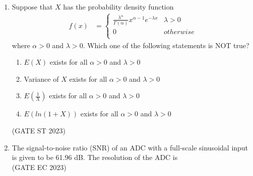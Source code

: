 \begin{enumerate}[label=\thechapter.\arabic*,ref=\thechapter.\theenumi]
\item Suppose that $X$ has the probability density function
\begin{align}
f(x)&=
\begin{cases}
\frac{\lambda^{\alpha}}{\Gamma(\alpha)}x^{\alpha - 1} e^{-\lambda x} & \lambda > 0\\
0 & otherwise\\
\end{cases}
\end{align}
where $\alpha > 0$ and $\lambda > 0$. Which one of the following statements is NOT true?
\begin{enumerate}
\item $E(X)$ exists for all $\alpha > 0 $ and $ \lambda > 0$
\item Variance of $X$ exists for all $\alpha > 0$ and $\lambda > 0$
\item $E(\frac{1}{X})$ exists for all $\alpha > 0$ and $\lambda > 0$
\item $E(ln(1+X))$ exists for all $\alpha > 0$ and $\lambda > 0$
\end{enumerate}
\hfill (GATE ST 2023)\\

\item The signal-to-noise ratio (SNR) of an ADC with a full-scale sinusoidal input is given to be 61.96 dB. The resolution of the ADC is \\
\hfill (GATE EC 2023)\\

\end{enumerate}
